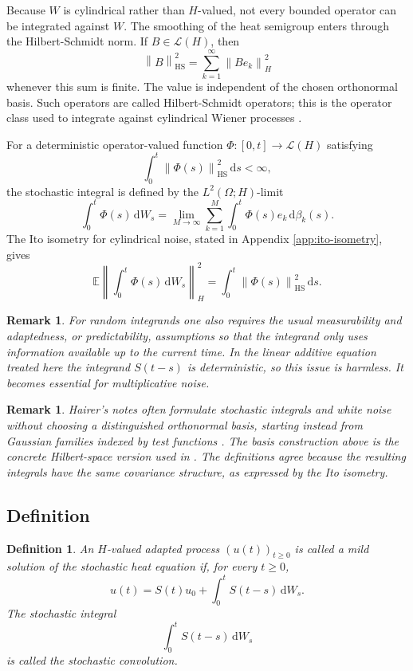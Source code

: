 \documentclass[11pt,a4paper]{article}
\newtheorem{definition}[theorem]{Definition}
\newtheorem{remark}[theorem]{Remark}
\newcommand{\E}{\mathbb{E}}
\newcommand{\dd}{\,\mathrm{d}}
\newcommand{\HS}{\mathrm{HS}}
\newcommand{\norm}[1]{\left\lVert #1 \right\rVert}
\begin{document}
Because \(W\) is cylindrical rather than \(H\)-valued, not every bounded
operator can be integrated against \(W\). The smoothing of the heat semigroup
enters through the Hilbert-Schmidt norm. If \(B\in\mathcal L(H)\), then
\[
  \norm{B}_{\HS}^2
  =
  \sum_{k=1}^{\infty}\norm{Be_k}_H^2
\]
whenever this sum is finite. The value is independent of the chosen
orthonormal basis. Such operators are called Hilbert-Schmidt operators; this is
the operator class used to integrate against cylindrical Wiener processes
\cite{delSarto2025,daPratoZabczyk}.

For a deterministic operator-valued function
\(\Phi:[0,t]\to\mathcal L(H)\) satisfying
\[
  \int_0^t\norm{\Phi(s)}_{\HS}^2\dd s<\infty,
\]
the stochastic integral is defined by the \(L^2(\Omega;H)\)-limit
\[
  \int_0^t \Phi(s)\dd W_s
  =
  \lim_{M\to\infty}
  \sum_{k=1}^{M}\int_0^t \Phi(s)e_k\dd\beta_k(s).
\]
The Ito isometry for cylindrical noise, stated in Appendix
\ref{app:ito-isometry}, gives
\[
  \E\left\|\int_0^t \Phi(s)\dd W_s\right\|_H^2
  =
  \int_0^t\norm{\Phi(s)}_{\HS}^2\dd s.
\]

\begin{remark}
For random integrands one also requires the usual measurability and
adaptedness, or predictability, assumptions so that the integrand only uses
information available up to the current time. In the linear additive equation
treated here the integrand \(S(t-s)\) is deterministic, so this issue is
harmless. It becomes essential for multiplicative noise.
\end{remark}

\begin{remark}
Hairer's notes often formulate stochastic integrals and white noise without
choosing a distinguished orthonormal basis, starting instead from Gaussian
families indexed by test functions \cite{hairer2009}. The basis construction
above is the concrete Hilbert-space version used in \cite{delSarto2025}. The
definitions agree because the resulting integrals have the same covariance
structure, as expressed by the Ito isometry.
\end{remark}

\subsection{Definition}

\begin{definition}
An \(H\)-valued adapted process \((u(t))_{t\ge0}\) is called a mild solution of
the stochastic heat equation if, for every \(t\ge0\),
\[
  u(t)
  =
  S(t)u_0
  +
  \int_0^t S(t-s)\dd W_s.
\]
The stochastic integral
\[
  \int_0^t S(t-s)\dd W_s
\]
is called the stochastic convolution.
\end{definition}
\end{document}
